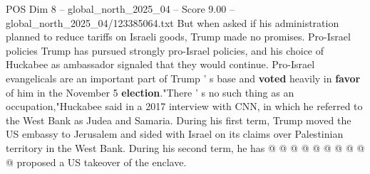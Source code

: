 \begin{textsample}{POS Dim 8 – global\_north\_2025\_04 – Score 9.00 – global\_north\_2025\_04/123385064.txt}
But when asked if his administration planned to reduce tariffs on Israeli goods, Trump made no promises.
Pro-Israel policies Trump has pursued strongly pro-Israel policies, and his choice of Huckabee as ambassador signaled that they would continue.
Pro-Israel evangelicals are an important part of Trump ' s base and \textbf{voted} heavily in \textbf{favor} of him in the November 5 \textbf{election}."There ' s no such thing as an occupation,"Huckabee said in a 2017 interview with CNN, in which he referred to the West Bank as Judea and Samaria.
During his first term, Trump moved the US embassy to Jerusalem and sided with Israel on its claims over Palestinian territory in the West Bank.
During his second term, he has @ @ @ @ @ @ @ @ @ @ proposed a US takeover of the enclave.

\end{textsample}

